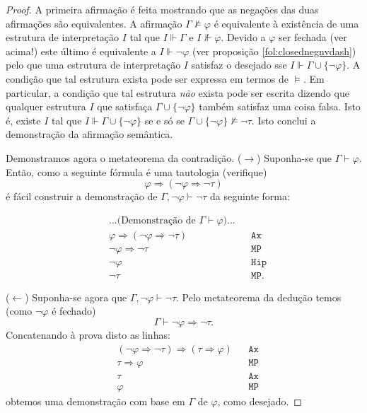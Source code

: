 \documentclass{report}
\theoremstyle{definition}
\theoremstyle{remark}
\newcommand{\imply}{\mathbin{\Rightarrow}}
\begin{document}
	\begin{proof}
	A primeira afirmação é feita mostrando que as negações das duas afirmações são equivalentes. A afirmação $\Gamma \nvDash \varphi$ é equivalente à existência de uma estrutura de interpretação $I$ tal que $I \Vdash \Gamma$ e $I \nVdash \varphi$. Devido a $\varphi$ ser fechada (ver acima!) este último é equivalente a $I \Vdash \neg \varphi$ (ver proposição \ref{fol:closednegnvdash}) pelo que uma estrutura de interpretação $I$ satisfaz o desejado sse $I \Vdash \Gamma \cup \{\neg \varphi\}$. A condição que tal estrutura exista pode ser expressa em termos de $\vDash$. Em particular, a condição que tal estrutura \emph{não} exista pode ser escrita dizendo que qualquer estrutura $I$ que satisfaça $\Gamma \cup \{\neg \varphi\}$ também satisfaz uma coisa falsa. Isto é, existe $I$ tal que $I \Vdash \Gamma \cup \{\neg \varphi\}$ se e só se $\Gamma \cup \{\neg \varphi\} \nvDash \neg \tau$. Isto conclui a demonstração da afirmação semântica.
	
	Demonstramos agora o metateorema da contradição. ($\rightarrow$) Suponha-se que $\Gamma \vdash \varphi$. Então, como a seguinte fórmula é uma tautologia (verifique)
	\[\varphi \imply (\neg \varphi \imply \neg \tau)\]
	é fácil construir a demonstração de $\Gamma, \neg \varphi \vdash \neg \tau$ da seguinte forma:
	
	\begin{align*}
	&\text{...(Demonstração de $\Gamma \vdash \varphi$)...}\\
	&\varphi \imply (\neg \varphi \imply \neg \tau)&&\texttt{Ax}\\
	&\neg \varphi \imply \neg \tau&&\texttt{MP}\\
	&\neg \varphi&&\texttt{Hip}\\
	&\neg \tau&&\texttt{MP}.
	\end{align*}
	
	($\leftarrow$) Suponha-se agora que $\Gamma, \neg \varphi \vdash \neg \tau$. Pelo metateorema da dedução temos (como $\neg \varphi$ é fechado)
	\[\Gamma \vdash \neg \varphi \imply \neg \tau.\]
	Concatenando à prova disto as linhas:
	\begin{align*}
	&(\neg \varphi \imply \neg \tau) \imply (\tau \imply \varphi)&&\texttt{Ax}\\
	&\tau \imply \varphi&&\texttt{MP}\\
	&\tau&&\texttt{Ax}\\
	&\varphi&&\texttt{MP}
	\end{align*}
	obtemos uma demonstração com base em $\Gamma$ de $\varphi$, como desejado.
	\end{proof}
	
\end{document}
